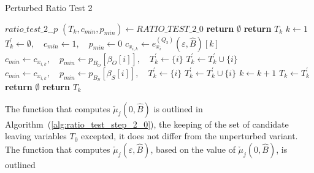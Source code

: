 \documentclass[a4paper]{article}
\begin{document}
\begin{algorithm}
\caption{Perturbed Ratio Test 2}
\label{alg:ratio_test_step_2_pert}
\begin{algorithmic}
\State $ratio\_test\_2\_\_p$
\State $(T_{k}, c_{min}, p_{min}) \gets RATIO\_TEST\_2\_0$
    \State \textbf{return} $\emptyset$
    \State \textbf{return} $T_{k}$
\Else
    \State $k \gets 1$
    \Repeat
        \State $T_{k}^{\prime} \gets \emptyset,
	  \quad c_{min} \gets 1,
	  \quad p_{min} \gets 0$
            \State $c_{x_{i,k}} \gets e_{x_{i}}^{(Q_{2})}
	      (\varepsilon, \hat{B})[k]$
	     
	            \State $c_{min} \gets c_{x_{i,k}},
		      \quad p_{min} \gets p_{B_{O}}[\beta_{O}[i]],
		      \quad T_{k}^{\prime} \gets \{i\}$
	            \State $T_{k}^{\prime} \gets T_{k}^{\prime} \cup \{i\}$
	        \EndIf
	    \Else {}
	            \State $c_{min} \gets c_{x_{i,k}},
		      \quad p_{min} \gets p_{B_{S}}[\beta_{S}[i]],
		      \quad T_{k}^{\prime} \gets \{i\}$
	            \State $T_{k}^{\prime} \gets T_{k}^{\prime} \cup \{i\}$
	        \EndIf
	    \EndIf
        \EndFor
        \State $k \gets k+1$
        \State $T_{k} \gets T_{k}^{\prime}$ 
        \State \textbf{return} $\emptyset$
    \Else
        \State \textbf{return} $T_{k}$
    \EndIf
\EndIf    
\EndFunction
\end{algorithmic}
\end{algorithm}
The function that computes $\check{\mu}_{j}(0, \hat{B})$ is outlined in
Algorithm~(\ref{alg:ratio_test_step_2_0}), the keeping of the set of
candidate leaving variables $T_{0}$ excepted, it does not differ from the
unperturbed variant. 
The function that computes $\check{\mu}_{j}(\varepsilon, \hat{B})$, based on
the value of $\check{\mu}_{j}(0, \hat{B})$, is outlined
\end{document}
